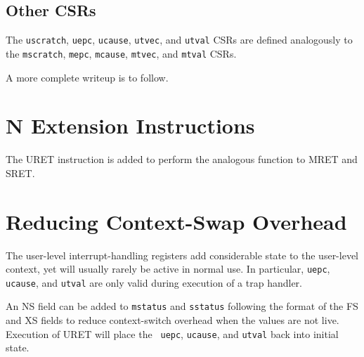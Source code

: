 \subsection{Other CSRs}

The {\tt uscratch}, {\tt uepc}, {\tt ucause}, {\tt utvec}, and {\tt utval}
CSRs are defined analogously to the {\tt mscratch}, {\tt mepc}, {\tt mcause},
{\tt mtvec}, and {\tt mtval} CSRs.

\begin{commentary}
  A more complete writeup is to follow.
\end{commentary}

\section{N Extension Instructions}

The URET instruction is added to perform the analogous function to
MRET and SRET.

\section{Reducing Context-Swap Overhead}

The user-level interrupt-handling registers add considerable state to
the user-level context, yet will usually rarely be active in normal
use.  In particular, {\tt uepc}, {\tt ucause}, and {\tt utval} are
only valid during execution of a trap handler.

An NS field can be added to {\tt mstatus} and {\tt sstatus} following
the format of the FS and XS fields to reduce context-switch overhead
when the values are not live.  Execution of URET will place the {\tt
  uepc}, {\tt ucause}, and {\tt utval} back into initial state.
